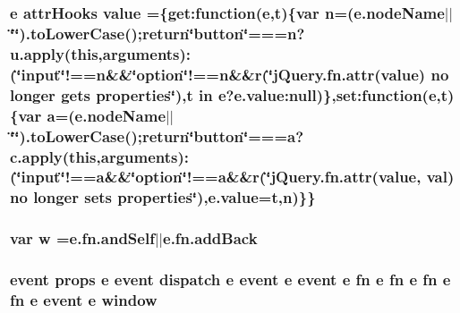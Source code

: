 \subsubsection[{value}]{ {\bf e} attr\+Hooks value =\{get\+:function({\bf e},{\bf t})\{var {\bf n}=(e.\+node\+Name$\vert$$\vert$\char`\"{}\char`\"{}).to\+Lower\+Case();return\char`\"{}button\char`\"{}===n?u.\+apply({\bf this},arguments)\+:(\char`\"{}input\char`\"{}!==n\&\&\char`\"{}option\char`\"{}!==n\&\&{\bf r}(\char`\"{}j\+Query.\+fn.\+attr(\textquotesingle{}value\textquotesingle{}) no longer gets properties\char`\"{}),t in {\bf e}?e.\+value\+:null)\},set\+:function({\bf e},{\bf t})\{var {\bf a}=(e.\+node\+Name$\vert$$\vert$\char`\"{}\char`\"{}).to\+Lower\+Case();return\char`\"{}button\char`\"{}===a?c.\+apply({\bf this},arguments)\+:(\char`\"{}input\char`\"{}!==a\&\&\char`\"{}option\char`\"{}!==a\&\&{\bf r}(\char`\"{}j\+Query.\+fn.\+attr(\textquotesingle{}value\textquotesingle{}, val) no longer sets properties\char`\"{}),e.\+value={\bf t},{\bf n})\}\}}\label{jquery-migrate-1_82_81_8min_8js_a481608999890fc20ef59d85cb8ff1e70}
\hypertarget{jquery-migrate-1_82_81_8min_8js_a9721a992655f700bdc2e91ba68b71e26}{}
\subsubsection[{w}]{\setlength{\rightskip}{0pt plus 5cm}var w ={\bf e.\+fn.\+and\+Self}$\vert$$\vert$e.\+fn.\+add\+Back}\label{jquery-migrate-1_82_81_8min_8js_a9721a992655f700bdc2e91ba68b71e26}
\hypertarget{jquery-migrate-1_82_81_8min_8js_a09a0b073bdca48a515d6d31fc736a2bc}{}
\subsubsection[{window}]{ {\bf event} props {\bf e} {\bf event} {\bf dispatch} {\bf e} {\bf event} {\bf e} {\bf event} {\bf e} {\bf fn} {\bf e} {\bf fn} {\bf e} {\bf fn} {\bf e} {\bf fn} {\bf e} {\bf event} {\bf e} window}\label{jquery-migrate-1_82_81_8min_8js_a09a0b073bdca48a515d6d31fc736a2bc}
\hypertarget{jquery-migrate-1_82_81_8min_8js_a81e910173af87b1161e719a504d52407}{}
